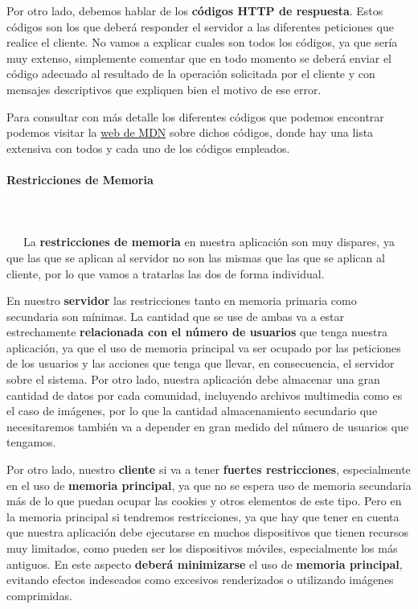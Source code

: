 Por otro lado, debemos hablar de los \textbf{códigos HTTP de respuesta}. Estos códigos son los que deberá responder el servidor a las diferentes peticiones que realice el cliente. No vamos a explicar cuales son todos los códigos, ya que sería muy extenso, simplemente comentar que en todo momento se deberá enviar el código adecuado al resultado de la operación solicitada por el cliente y con mensajes descriptivos que expliquen bien el motivo de ese error. 

Para consultar con más detalle los diferentes códigos que podemos encontrar podemos visitar la \href{https://developer.mozilla.org/en-US/docs/Web/HTTP/Status}{web de MDN} sobre dichos códigos, donde hay una lista extensiva con todos y cada uno de los códigos empleados.

\paragraph{Restricciones de Memoria}
~\\\\
\-\ \-\ \-\ La \textbf{restricciones de memoria} en nuestra aplicación son muy dispares, ya que las que se aplican al servidor no son las mismas que las que se aplican al cliente, por lo que vamos a tratarlas las dos de forma individual.

En nuestro \textbf{servidor} las restricciones tanto en memoria primaria como secundaria son mínimas. La cantidad que se use de ambas va a estar estrechamente \textbf{relacionada con el número de usuarios} que tenga nuestra aplicación, ya que el uso de memoria principal va ser ocupado por las peticiones de los usuarios y las acciones que tenga que llevar, en consecuencia, el servidor sobre el sistema. Por otro lado, nuestra aplicación debe almacenar una gran cantidad de datos por cada comunidad, incluyendo archivos multimedia como es el caso de imágenes, por lo que la cantidad almacenamiento secundario que necesitaremos también va a depender en gran medido del número de usuarios que tengamos.

Por otro lado, nuestro \textbf{cliente} si va a tener \textbf{fuertes restricciones}, especialmente en el uso de\textbf{ memoria principal}, ya que no se espera uso de memoria secundaria más de lo que puedan ocupar las cookies y otros elementos de este tipo. Pero en la memoria principal si tendremos restricciones, ya que hay que tener en cuenta que nuestra aplicación debe ejecutarse en muchos dispositivos que tienen recursos muy limitados, como pueden ser los dispositivos móviles, especialmente los más antiguos. En este aspecto \textbf{deberá minimizarse} el uso de \textbf{memoria principal}, evitando efectos indeseados como excesivos renderizados o utilizando imágenes comprimidas.

